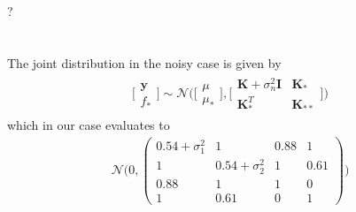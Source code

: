 \documentclass[11pt]{article}
\newcommand{\exercise}{\section{}}
\begin{document}
\exercise
?

\exercise
The joint distribution in the noisy case is given by
\begin{align*}
	\Big[
	\begin{matrix}
		\boldsymbol{y}\\
		f_*
	\end{matrix}
	\Big]
	\sim \mathcal{N} \Big(\Big[
	\begin{matrix}
		\mu\\
		\mu_*
	\end{matrix}
	\Big], \Big[
	\begin{matrix}
		\boldsymbol{K} + \sigma^2_n \boldsymbol{I} & \boldsymbol{K}_* \\
		\boldsymbol{K}^T_* & \boldsymbol{K}_{**}
	\end{matrix}
	\Big]
	\Big)
\end{align*}
which in our case evaluates to
\begin{align*}
	\mathcal N \Big(0,
	\begin{pmatrix}
		0.54 + \sigma^2_1 & 1 & 0.88 & 1\\
		1 & 0.54 + \sigma^2_2 & 1 & 0.61\\		
		0.88 & 1 & 1 & 0\\
		1 & 0.61 & 0 & 1
	\end{pmatrix}
	\Big)
\end{align*}
\end{document}
